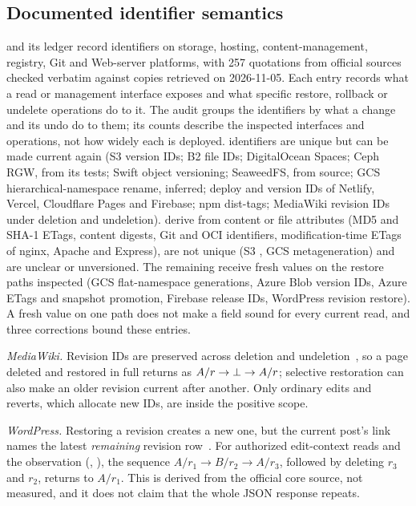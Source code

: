 \subsection{Documented identifier semantics}
 and its ledger record
\nAuditIdentifiers{} identifiers on \nAuditPlatforms{} storage, hosting,
content-management, registry, Git and Web-server platforms, with 257 quotations
from \nAuditSources{}
official sources checked verbatim against copies retrieved on 2026-11-05. Each
entry records what a read or management interface exposes and what specific
restore, rollback or undelete operations do to it. The audit groups the
identifiers by what a change and its undo do to them; its counts describe the
inspected interfaces and operations, not how widely each is deployed.
\nAuditReactivating{} identifiers are unique but can be made current again (S3
version IDs; B2 file IDs; DigitalOcean Spaces; Ceph RGW, from its tests; Swift
object versioning; SeaweedFS, from source; GCS hierarchical-namespace rename,
inferred; deploy and version IDs of Netlify, Vercel, Cloudflare Pages and
Firebase; npm dist-tags; MediaWiki revision IDs under deletion and
undeletion). \nAuditDerived{} derive from content or file attributes (MD5 and
SHA-1 ETags, content digests, Git and OCI identifiers, modification-time ETags
of nginx, Apache and Express), \nAuditNotUnique{} are not unique (S3
, GCS metageneration) and \nAuditOther{} are unclear or
unversioned. The remaining \nAuditFresh{} receive fresh values on the restore
paths inspected (GCS flat-namespace generations, Azure Blob version IDs, Azure
ETags and snapshot promotion, Firebase release IDs, WordPress revision
restore). A fresh value on one path does not make a field sound for every
current read, and three corrections bound these entries.

\emph{MediaWiki.} Revision IDs are preserved across deletion and
undeletion~\cite{mediawikirevision}, so a page deleted and restored in full
returns as $A/r\to\bot\to A/r$; selective restoration can also make an older
revision current after another. Only ordinary edits and reverts, which
allocate new IDs, are inside the positive scope.

\emph{WordPress.} Restoring a revision creates a new one, but the current
post's  link names the latest \emph{remaining}
revision row~\cite{wordpressrest}. For authorized edit-context reads and the
observation (, ), the sequence
$A/r_1\to B/r_2\to A/r_3$, followed by deleting $r_3$ and $r_2$, returns to
$A/r_1$. This is derived from the official core source, not measured, and it
does not claim that the whole JSON response repeats.

